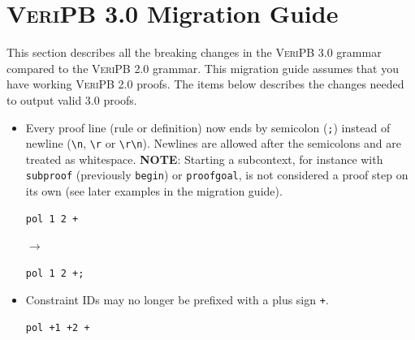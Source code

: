 \documentclass[a4paper]{article}
\newcommand{\veriPB}[0]{\textsc{VeriPB}}
\begin{document}
\section{\veriPB{} 3.0 Migration Guide}\label{sec:migration}
This section describes all the breaking changes in the \veriPB{} 3.0 grammar compared to the \veriPB{} 2.0 grammar. This migration guide assumes that you have working \veriPB{} 2.0 proofs. The items below describes the changes needed to output valid 3.0 proofs.
\begin{itemize}
	\item Every proof line (rule or definition) now ends by semicolon (\verb!;!) instead of newline (\verb!\n!, \verb!\r! or \verb!\r\n!). Newlines are allowed after the semicolons and are treated as whitespace. \textbf{NOTE}: Starting a subcontext, for instance with \lstinline[language=veripb]!subproof! (previously {\color{veripb-environment}\verb!begin!}) or \lstinline[language=veripb]!proofgoal!, is not considered a proof step on its own (see later examples in the migration guide).
	      \\[1mm]
	      \begin{minipage}{.47\linewidth}
		      \begin{lstlisting}[language=veripb, gobble=8, rulecolor=\color{veripb-invalid-text}, caption={\veriPB{} 2.0 syntax.}]
		pol 1 2 +
		\end{lstlisting}
	      \end{minipage}\hfill%
	      \begin{minipage}[t]{.05\linewidth}
		      \centering \vspace*{-5mm}$\to$
	      \end{minipage}\hfill%
	      \hfill%
	      \begin{minipage}{.47\linewidth}
		      \begin{lstlisting}[language=veripb, gobble=8, rulecolor=\color{veripb-valid-text}, caption={\veriPB{} 3.0 syntax.}]
		pol 1 2 +;
		\end{lstlisting}
	      \end{minipage}
	\item Constraint IDs may no longer be prefixed with a plus sign \verb!+!.
	      \\[1mm]
	      \begin{minipage}{.47\linewidth}
		      \begin{lstlisting}[language=veripb, gobble=8, rulecolor=\color{veripb-invalid-text}, caption={\veriPB{} 2.0 syntax.}]
		pol +1 +2 +
		\end{lstlisting}

\end{minipage}
\end{itemize}
\end{document}
